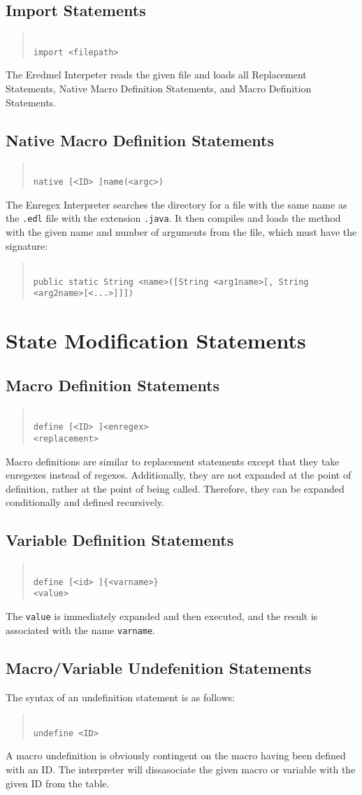 \documentclass{article}
\newcommand{\code}[1]{\texttt{#1}}
\newcommand{\codeblock}[1]{\begin{quote}\code{\\\noindent #1}\end{quote}}
\newcommand{\indt}{\hspace*{2em}}
\begin{document}
\subsection{Import Statements}
\codeblock{import <filepath>}
The Eredmel Interpeter reads the given file and loads all Replacement Statements, Native Macro Definition Statements, and Macro Definition Statements.
\subsection{Native Macro Definition Statements}
\codeblock{native [<ID> ]name(<argc>)}
The Enregex Interpreter searches the directory for a file with the same name as the \code{.edl} file with the extension \code{.java}. It then compiles and loads the method with the given name and number of arguments from the file, which must have the signature:
\codeblock{public static String <name>([String <arg1name>[, String <arg2name>[<...>]]])}

\section{State Modification Statements}
\subsection{Macro Definition Statements}
\codeblock{
define [<ID> ]<enregex>\\
\indt<replacement>}
Macro definitions are similar to replacement statements except that they take enregexes instead of regexes. Additionally, they are not expanded at the point of definition, rather at the point of being called. Therefore, they can be expanded conditionally and defined recursively.
\subsection{Variable Definition Statements}
\codeblock{
define [<id> ]\{<varname>\}\\
\indt<value>
}

The \code{value} is immediately expanded and then executed, and the result is associated with the name \code{varname}.

\subsection{Macro/Variable Undefenition Statements}
The syntax of an undefinition statement is as follows:
\codeblock{
undefine <ID>}
A macro undefinition is obviously contingent on the macro having been defined with an ID. The interpreter will dissasociate the given macro or variable with the given ID from the table.
\end{document}
